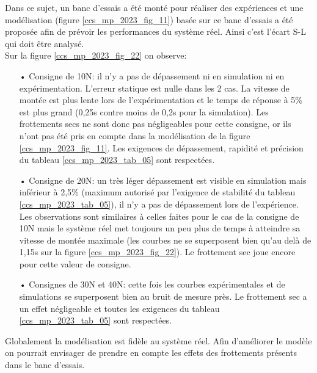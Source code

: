 \ifprof
\begin{corrige}
Dans ce sujet, un banc d'essais a été monté pour réaliser des expériences et une modélisation (figure \ref{ccs_mp_2023_fig_11}) basée sur ce banc d'essais a été proposée afin de prévoir les performances du système réel. Ainsi c'est l'écart S-L qui doit être analysé.\\

Sur la figure \ref{ccs_mp_2023_fig_22} on observe:
\begin{itemize}
\item[•] Consigne de 10N: il n'y a pas de dépassement ni en simulation ni en expérimentation. L'erreur statique est nulle dans les 2 cas. La vitesse de montée est plus lente lors de l'expérimentation et le temps de réponse à 5\% est plus grand (0,25s contre moins de 0,2s pour la simulation). Les frottements secs ne sont donc pas négligeables pour cette consigne, or ils n'ont pas été pris en compte dans la modélisation de la figure \ref{ccs_mp_2023_fig_11}. Les exigences de dépassement, rapidité et précision du tableau \ref{ccs_mp_2023_tab_05} sont respectées. 
\item[•] Consigne de 20N: un très léger dépassement est visible en simulation mais inférieur à 2,5\% (maximum autorisé par l'exigence de stabilité du tableau \ref{ccs_mp_2023_tab_05}), il n'y a pas de dépassement lors de l'expérience. Les observations sont similaires à celles faites pour le cas de la consigne de 10N mais le système réel met toujours un peu plus de temps à atteindre sa vitesse de montée maximale (les courbes ne se superposent bien qu'au delà de 1,15s sur la figure \ref{ccs_mp_2023_fig_22}). Le frottement sec joue encore pour cette valeur de consigne.
\item[•] Consignes de 30N et 40N: cette fois les courbes expérimentales et de simulations se superposent bien au bruit de mesure près. Le frottement sec a un effet négligeable et toutes les exigences du tableau \ref{ccs_mp_2023_tab_05} sont respectées.
\end{itemize}

Globalement la modélisation est fidèle au système réel. Afin d'améliorer le modèle on pourrait envisager de prendre en compte les effets des frottements présents dans le banc d'essais.


\end{corrige}
\else
\fi


